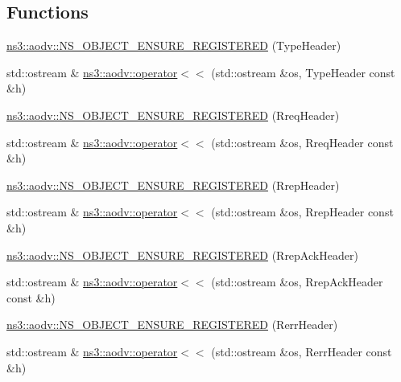 \subsection*{Functions}
\begin{DoxyCompactItemize}
\item 
\hyperlink{namespacens3_1_1aodv_a676bd2634b5fae8a1d4b75fec94461eb}{ns3\+::aodv\+::\+N\+S\+\_\+\+O\+B\+J\+E\+C\+T\+\_\+\+E\+N\+S\+U\+R\+E\+\_\+\+R\+E\+G\+I\+S\+T\+E\+R\+ED} (Type\+Header)
\item 
std\+::ostream \& \hyperlink{namespacens3_1_1aodv_a90ef9ec7b33676a188a27d37e74b8d44}{ns3\+::aodv\+::operator$<$$<$} (std\+::ostream \&os, Type\+Header const \&h)
\item 
\hyperlink{namespacens3_1_1aodv_a7211789211837615faa1f2124955024d}{ns3\+::aodv\+::\+N\+S\+\_\+\+O\+B\+J\+E\+C\+T\+\_\+\+E\+N\+S\+U\+R\+E\+\_\+\+R\+E\+G\+I\+S\+T\+E\+R\+ED} (Rreq\+Header)
\item 
std\+::ostream \& \hyperlink{namespacens3_1_1aodv_a3d3e78cc63ed6b8026c97501e54b2cf4}{ns3\+::aodv\+::operator$<$$<$} (std\+::ostream \&os, Rreq\+Header const \&h)
\item 
\hyperlink{namespacens3_1_1aodv_a10a2de3f3142c601399791086da01970}{ns3\+::aodv\+::\+N\+S\+\_\+\+O\+B\+J\+E\+C\+T\+\_\+\+E\+N\+S\+U\+R\+E\+\_\+\+R\+E\+G\+I\+S\+T\+E\+R\+ED} (Rrep\+Header)
\item 
std\+::ostream \& \hyperlink{namespacens3_1_1aodv_a7d52512b5bc6196c6eabcb26ca9102e2}{ns3\+::aodv\+::operator$<$$<$} (std\+::ostream \&os, Rrep\+Header const \&h)
\item 
\hyperlink{namespacens3_1_1aodv_aff9d8a361c73b8bd31c3eb37b05d5bac}{ns3\+::aodv\+::\+N\+S\+\_\+\+O\+B\+J\+E\+C\+T\+\_\+\+E\+N\+S\+U\+R\+E\+\_\+\+R\+E\+G\+I\+S\+T\+E\+R\+ED} (Rrep\+Ack\+Header)
\item 
std\+::ostream \& \hyperlink{namespacens3_1_1aodv_a26d242a58b2d7ebe77bfff59c5ce75b1}{ns3\+::aodv\+::operator$<$$<$} (std\+::ostream \&os, Rrep\+Ack\+Header const \&h)
\item 
\hyperlink{namespacens3_1_1aodv_aecf6dc931dffd60698905e8487136a9f}{ns3\+::aodv\+::\+N\+S\+\_\+\+O\+B\+J\+E\+C\+T\+\_\+\+E\+N\+S\+U\+R\+E\+\_\+\+R\+E\+G\+I\+S\+T\+E\+R\+ED} (Rerr\+Header)
\item 
std\+::ostream \& \hyperlink{namespacens3_1_1aodv_a1954bbce17a97f6c7f499343302714d8}{ns3\+::aodv\+::operator$<$$<$} (std\+::ostream \&os, Rerr\+Header const \&h)
\end{DoxyCompactItemize}
